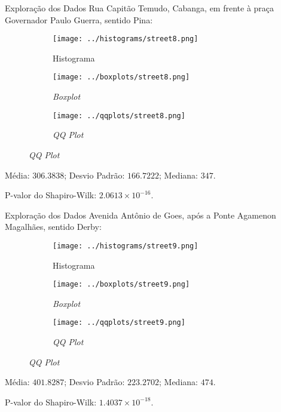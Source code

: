 \begin{frame}{Exploração dos Dados}
Rua Capitão Temudo, Cabanga, em frente à praça Governador Paulo Guerra, sentido
Pina:
\begin{figure}
	\centering
	\begin{subfigure}{.33\textwidth}
		\centering
		\texttt{[image: ../histograms/street8.png]}
		\caption*{Histograma}
	\end{subfigure}%
	\begin{subfigure}{.33\textwidth}
		\centering
		\texttt{[image: ../boxplots/street8.png]}
		\caption*{\textit{Boxplot}}
	\end{subfigure}
	\begin{subfigure}{.32\textwidth}
		\centering
		\texttt{[image: ../qqplots/street8.png]}
		\caption*{\textit{QQ Plot}}
	\end{subfigure}
\end{figure}
Média: $306.3838$; Desvio Padrão: $166.7222$; Mediana: $347$.

P-valor do Shapiro-Wilk: $2.0613 \times 10^{-16}$.
\end{frame}

\begin{frame}{Exploração dos Dados}
Avenida Antônio de Goes, após a Ponte Agamenon Magalhães, sentido Derby:
\begin{figure}
	\centering
	\begin{subfigure}{.33\textwidth}
		\centering
		\texttt{[image: ../histograms/street9.png]}
		\caption*{Histograma}
	\end{subfigure}%
	\begin{subfigure}{.33\textwidth}
		\centering
		\texttt{[image: ../boxplots/street9.png]}
		\caption*{\textit{Boxplot}}
	\end{subfigure}
	\begin{subfigure}{.32\textwidth}
		\centering
		\texttt{[image: ../qqplots/street9.png]}
		\caption*{\textit{QQ Plot}}
	\end{subfigure}
\end{figure}
Média: $401.8287$; Desvio Padrão: $223.2702$; Mediana: $474$.

P-valor do Shapiro-Wilk: $1.4037 \times 10^{-18}$.
\end{frame}

